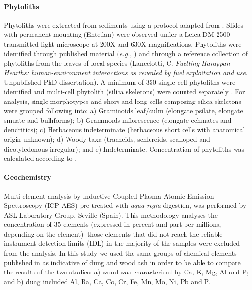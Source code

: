 \documentclass[authoryear,preprint,review,12pt]{elsarticle}
\begin{document}
\paragraph{Phytoliths}
Phytoliths were extracted from sediments using a protocol adapted from \citet{Madella1998}. Slides with permanent mounting (Entellan\textregistered) were observed under a Leica DM 2500 transmitted light microscope at 200X and 630X magnifications. Phytoliths were identified through published material (\emph{e.g.}, \citealp{Pearsall2008a,Piperno2006}) and through a reference collection of phytoliths from the leaves of local species (Lancelotti, C. \textit{Fuelling Harappan Hearths: human-environment interactions as revealed by fuel exploitation and use}. Unpublished PhD dissertation). A minimum of 350 single-cell phytoliths were identified and multi-cell phytolith (silica skeletons) were counted separately \citep{Zurro2010}. For analysis, single morphotypes and short and long cells composing silica skeletons were grouped following \citet{Lancelotti2012} into: a) Graminoids leaf/culm (elongate psilate, elongate sinuate and bulliforms); b) Graminoids inflorescence (elongate echinates and dendritics); c) Herbaceous indeterminate (herbaceous short cells with anatomical origin unknown); d) Woody taxa (tracheids, schlereids, scalloped and dicotyledonous irregular); and e) Indeterminate. Concentration of phytoliths was calculated according to \citet{Albert2001}.
\paragraph{Geochemistry}
Multi-element analysis by Inductive Coupled Plasma Atomic Emission Spettroscopy (ICP-AES) pre-treated with \textit{aqua regia} digestion, was performed by ASL Laboratory Group, Seville (Spain). This methodology analyses the concentration of 35 elements (expressed in percent and part per millions, depending on the element); those elements that did not reach the reliable instrument detection limits (IDL) in the majority of the samples were excluded from the analysis. In this study we used the same groups of chemical elements published in \citet{Rondelli2014} as indicative of dung and wood ash in order to be able to compare the results of the two studies: a) wood was characterised by Ca, K, Mg, Al and P; and b) dung included Al, Ba, Ca, Co, Cr, Fe, Mn, Mo, Ni, Pb and P.
\end{document}
